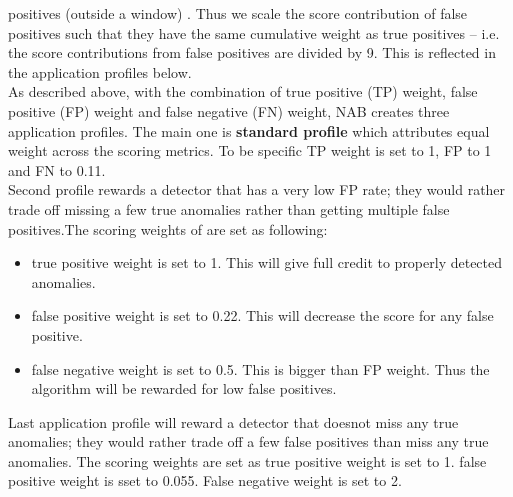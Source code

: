 \documentclass[12pt]{article}
\begin{document}
positives (outside a window) . Thus we scale the score contribution of false
positives such that they have the same cumulative weight as true positives – i.e.
the score contributions from false positives are divided by 9. This is reflected in
the application profiles below.\\
\break
As described above, with the combination of true positive (TP) weight, false positive (FP) weight and false negative (FN) weight, NAB creates three application profiles. The main one is \textbf{standard profile} which attributes equal weight
across the scoring metrics. To be specific TP weight is set to 1, FP to 1 and FN to 0.11. \\
\break
Second profile rewards a detector that has a
very low FP rate; they would rather trade off missing a few true anomalies rather
than getting multiple false positives.The scoring weights of are set as following:
\begin{itemize}
\item true positive weight is set to 1. This will give full credit to properly detected anomalies. 
\item false positive weight is set to 0.22. This will decrease the score for any false positive.
\item false negative weight is set to 0.5. This is bigger than FP weight. Thus the algorithm will be rewarded for low false positives.
\end{itemize}
Last application profile will reward a detector that doesnot
miss any true anomalies; they would rather trade off a few false positives than
miss any true anomalies. The scoring weights are set as true positive weight is set to 1. false positive weight is sset to 0.055. False negative weight is set to 2.\\
\break
\end{document}
